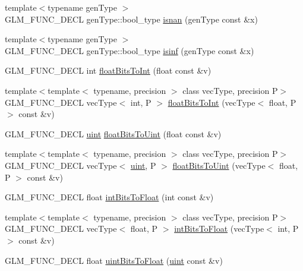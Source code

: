 \begin{DoxyCompactItemize}
\item 
{\footnotesize template$<$typename gen\-Type $>$ }\\G\-L\-M\-\_\-\-F\-U\-N\-C\-\_\-\-D\-E\-C\-L gen\-Type\-::bool\-\_\-type \hyperlink{group__core__func__common_ga8a9dec5200888766fbcb51b6a5898728}{isnan} (gen\-Type const \&x)
\item 
{\footnotesize template$<$typename gen\-Type $>$ }\\G\-L\-M\-\_\-\-F\-U\-N\-C\-\_\-\-D\-E\-C\-L gen\-Type\-::bool\-\_\-type \hyperlink{group__core__func__common_ga9fce6a337c7e8ad089b9dc17c70cb873}{isinf} (gen\-Type const \&x)
\item 
G\-L\-M\-\_\-\-F\-U\-N\-C\-\_\-\-D\-E\-C\-L int \hyperlink{group__core__func__common_gadc6a536a7bef046c3293d2ccad6d9ca2}{float\-Bits\-To\-Int} (float const \&v)
\item 
{\footnotesize template$<$template$<$ typename, precision $>$ class vec\-Type, precision P$>$ }\\G\-L\-M\-\_\-\-F\-U\-N\-C\-\_\-\-D\-E\-C\-L vec\-Type$<$ int, P $>$ \hyperlink{group__core__func__common_gac4a0710238ae54c67931dd29a0b0f873}{float\-Bits\-To\-Int} (vec\-Type$<$ float, P $>$ const \&v)
\item 
G\-L\-M\-\_\-\-F\-U\-N\-C\-\_\-\-D\-E\-C\-L \hyperlink{group__core__precision_ga4fd29415871152bfb5abd588334147c8}{uint} \hyperlink{group__core__func__common_ga748b4d2819b48d28ca09dc8733488873}{float\-Bits\-To\-Uint} (float const \&v)
\item 
{\footnotesize template$<$template$<$ typename, precision $>$ class vec\-Type, precision P$>$ }\\G\-L\-M\-\_\-\-F\-U\-N\-C\-\_\-\-D\-E\-C\-L vec\-Type$<$ \hyperlink{group__core__precision_ga4fd29415871152bfb5abd588334147c8}{uint}, P $>$ \hyperlink{group__core__func__common_ga1804d4c443605d8a27be644aa461afe4}{float\-Bits\-To\-Uint} (vec\-Type$<$ float, P $>$ const \&v)
\item 
G\-L\-M\-\_\-\-F\-U\-N\-C\-\_\-\-D\-E\-C\-L float \hyperlink{group__core__func__common_ga2650dc57b2148a6ffbce20944fb4d97a}{int\-Bits\-To\-Float} (int const \&v)
\item 
{\footnotesize template$<$template$<$ typename, precision $>$ class vec\-Type, precision P$>$ }\\G\-L\-M\-\_\-\-F\-U\-N\-C\-\_\-\-D\-E\-C\-L vec\-Type$<$ float, P $>$ \hyperlink{group__core__func__common_gad21ab176dd0e6b59d923db5efca87f4e}{int\-Bits\-To\-Float} (vec\-Type$<$ int, P $>$ const \&v)
\item 
G\-L\-M\-\_\-\-F\-U\-N\-C\-\_\-\-D\-E\-C\-L float \hyperlink{group__core__func__common_ga97464ca9ff4267de30ea408f700d4ca8}{uint\-Bits\-To\-Float} (\hyperlink{group__core__precision_ga4fd29415871152bfb5abd588334147c8}{uint} const \&v)

\end{DoxyCompactItemize}
